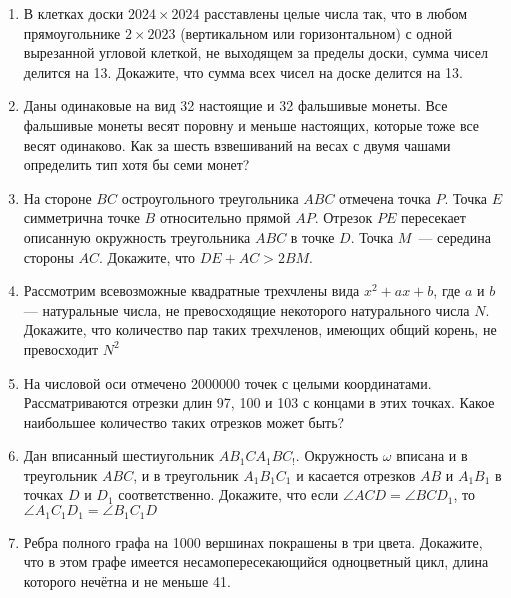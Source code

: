 \documentclass{article}
\begin{document}
    \begin{enumerate}[label*=\textbf{\arabic{enumi}.}]
        \setcounter{enumi}{0}
        \item В клетках доски $2024 \times 2024$ расставлены целые числа так, что в любом прямоугольнике $2 \times 2023$ (вертикальном или горизонтальном) с одной вырезанной угловой клеткой, не выходящем за пределы доски, сумма чисел делится на 13.
        Докажите, что сумма всех чисел на доске делится на 13.

        \item Даны одинаковые на вид 32 настоящие и 32 фальшивые монеты.
        Все фальшивые монеты весят поровну и меньше настоящих, которые тоже все весят одинаково.
        Как за шесть взвешиваний на весах с двумя чашами определить тип хотя бы семи монет?

        \item На стороне $BC$ остроугольного треугольника $ABC$ отмечена точка $P$.
        Точка $E$ симметрична точке $B$ относительно прямой $AP$.
        Отрезок $PE$ пересекает описанную окружность треугольника $ABC$ в точке $D$.
        Точка $M$~--- середина стороны $AC$.
        Докажите, что $DE + AC > 2BM$.

        \item Рассмотрим всевозможные квадратные трехчлены вида $x^2 + ax + b$, где $a$ и $b$ — натуральные числа, не превосходящие некоторого натурального числа $N$.
        Докажите, что количество пар таких трехчленов, имеющих общий корень, не превосходит $N^2$

        \item На числовой оси отмечено 2000000 точек с целыми координатами.
        Рассматриваются отрезки длин 97, 100 и 103 с концами в этих точках.
        Какое наибольшее количество таких отрезков может быть?

        \item Дан вписанный шестиугольник $AB_{1}CA_{1}BC_!$.
        Окружность $\omega$ вписана и в треугольник $ABC$, и в треугольник $A_{1}B_{1}C_1$ и касается отрезков $AB$ и $A_{1}B_1$ в точках $D$ и $D_1$ соответственно.
        Докажите, что если $\angle ACD = \angle BCD_1$, то $\angle A_{1}C_{1}D_1 = \angle B_{1}C_{1}D$

        \item Ребра полного графа на 1000 вершинах покрашены в три цвета.
        Докажите, что в этом графе имеется несамопересекающийся одноцветный цикл, длина которого нечётна и не меньше 41.
    \end{enumerate}
    \newpage
\end{document}
